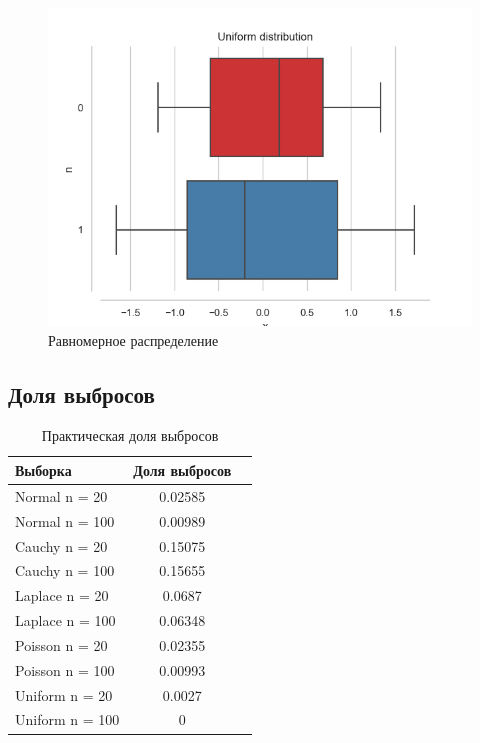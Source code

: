 \documentclass[../main.tex]{subfiles}
\begin{document}
    \begin{figure}[H]
        \centering
        \includegraphics[scale=0.8]{figures/UniformBoxplot.png}
        \caption{Равномерное распределение}
        \label{fig:normal}
    \end{figure}
    
    \subsection{Доля выбросов}
    \begin{table}[H]
	\centering
	\begin{tabular}{|l|c|c|}
		\hline
		Выборка & Доля выбросов	\\\hline
		\hline
		Normal n = 20 & 0.02585 \\\hline
		Normal n = 100 & 0.00989 \\\hline
		Cauchy n = 20 & 0.15075 \\\hline
		Cauchy n = 100 & 0.15655 \\\hline
		Laplace n = 20 & 0.0687 \\\hline
		Laplace n = 100 & 0.06348 \\\hline
		Poisson n = 20 & 0.02355 \\\hline
		Poisson n = 100 & 0.00993 \\\hline
		Uniform n = 20 & 0.0027\\\hline
		Uniform n = 100 & 0 \\\hline
	\end{tabular}
	\caption{Практическая доля выбросов}
    \end{table}
    
\end{document}
